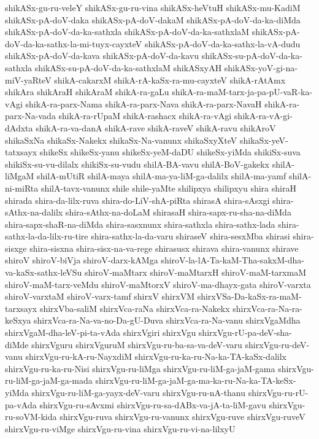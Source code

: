 {shikASx-gu-ru-veleY
shikASx-gu-ru-vina
shikASx-heVtuH
shikASx-mu-KadiM
shikASx-pA-doV-daka
shikASx-pA-doV-dakaM
shikASx-pA-doV-da-ka-diMda
shikASx-pA-doV-da-ka-sathxla
shikASx-pA-doV-da-ka-sathxlaM
shikASx-pA-doV-da-ka-sathx-la-mi-tuyx-cayxteV
shikASx-pA-doV-da-ka-sathx-la-vA-dudu
shikASx-pA-doV-da-kava
shikASx-pA-doV-da-kavu
shikASx-su-pA-doV-da-ka-sathxla
shikASx-su-pA-doV-da-ka-sathxlaM
shikASxyAH
shikASx-yoV-gi-na-miV-yaRteV
shikA-cakarxM
shikA-rA-kaSx-ra-mu-cayxteV
shikA-rAtAmx
shikAra
shikAraH
shikAraM
shikA-ra-gaLu
shikA-ra-maM-tarx-ja-pa-pU-vaR-ka-vAgi
shikA-ra-parx-Nama
shikA-ra-parx-Nava
shikA-ra-parx-NavaH
shikA-ra-parx-Na-vada
shikA-ra-rUpaM
shikA-rashacx
shikA-ra-vAgi
shikA-ra-vA-gi-dAdxta
shikA-ra-va-danA
shikA-rave
shikA-raveV
shikA-ravu
shikAroV
shikaSxNa
shikaSx-Nakekx
shikaSx-Na-vanunx
shikaSxyXteV
shikaSx-yeV-tatxsayx
shikeSx
shikeSx-yanu
shikeSx-yeM-daDU
shikeSx-yiMda
shikiSx-suva
shikiSx-su-vu-dilalx
shikiSx-su-vudu
shilA-BA-vavu
shilA-BoV-gakekx
shilA-liMgaM
shilA-mUtiR
shilA-maya
shilA-ma-ya-liM-ga-dalilx
shilA-ma-yamf
shilA-ni-miRta
shilA-tavx-vanunx
shile
shile-yaMte
shilipxya
shilipxyu
shira
shiraH
shirada
shira-da-lilx-ruva
shira-do-LiV-shA-piRta
shirasA
shira-sAsxgi
shira-sAthx-na-dalilx
shira-sAthx-na-doLaM
shirasaH
shira-sapx-ru-sha-na-diMda
shira-sapx-shaR-na-diMda
shira-sasxnunx
shira-sathxla
shira-sathx-lada
shira-sathx-la-da-lilx-ru-tire
shira-sathx-la-da-varu
shiraseV
shira-sesxMba
shirasi
shira-sisxge
shira-sisxna
shira-sisx-na-va-rege
shirasusx
shirava
shira-vanunx
shirave
shiroV
shiroV-biVja
shiroV-darx-kAMga
shiroV-la-lA-Ta-kaM-Tha-sakxM-dha-va-kaSx-sathx-leVSu
shiroV-maMtarx
shiroV-maMtarxH
shiroV-maM-tarxmaM
shiroV-maM-tarx-veMdu
shiroV-maMtorxV
shiroV-ma-dhayx-gata
shiroV-varxta
shiroV-varxtaM
shiroV-varx-tamf
shirxV
shirxVM
shirxVSa-Da-kaSx-ra-maM-tarxsayx
shirxVba-saliM
shirxVca-raNa
shirxVca-ra-Nakekx
shirxVca-ra-Na-ra-keSxya
shirxVca-ra-Na-va-no-Da-gU-Duva
shirxVca-ra-Na-vanu
shirxVgaMdha
shirxVgaM-dha-leV-pi-ta-vAda
shirxVgiri
shirxVgu
shirxVgu-rU-pa-deV-sha-diMde
shirxVguru
shirxVguruM
shirxVgu-ru-ba-sa-va-deV-varu
shirxVgu-ru-deV-vanu
shirxVgu-ru-kA-ru-NayxdiM
shirxVgu-ru-ka-ru-Na-ka-TA-kaSx-dalilx
shirxVgu-ru-ka-ru-Nisi
shirxVgu-ru-liMga
shirxVgu-ru-liM-ga-jaM-gama
shirxVgu-ru-liM-ga-jaM-ga-mada
shirxVgu-ru-liM-ga-jaM-ga-ma-ka-ru-Na-ka-TA-keSx-yiMda
shirxVgu-ru-liM-ga-yayx-deV-varu
shirxVgu-ru-nA-thanu
shirxVgu-ru-rU-pa-vAda
shirxVgu-ru-sAvxmi
shirxVgu-ru-sa-dABx-va-jA-ta-liM-gavu
shirxVgu-ru-soVM-kida
shirxVgu-ruva
shirxVgu-ru-vanunx
shirxVgu-ruve
shirxVgu-ruveV
shirxVgu-ru-viMge
shirxVgu-ru-vina
shirxVgu-ru-vi-na-lilxyU
}
